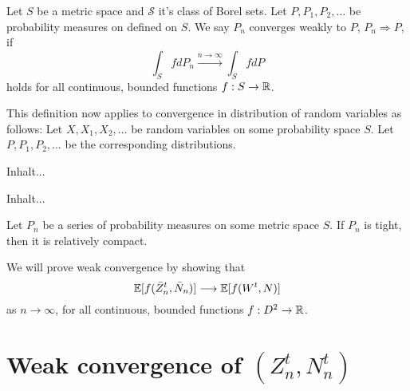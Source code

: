 \begin{definition}
	Let $S$ be a metric space and $\mathcal{S}$ it's class of Borel sets.
	Let $P, P_1, P_2, \dots$ be probability measures on defined on $S$.
	We say $P_n$ converges weakly to $P$, $P_n \Rightarrow P$, if
	\begin{equation} 
	\int_S fdP_n \xrightarrow{n \rightarrow \infty} \int_S fdP
	\end{equation}
	holds for all continuous, bounded functions $f: S \rightarrow \mathbb{R}$.
\end{definition}

This definition now applies to convergence in distribution of random variables as follows:
Let $X, X_1, X_2, \dots$ be random variables on some probability space $S$.
Let $P, P_1, P_2, \dots$ be the corresponding distributions. 

\begin{definition}[Tightness] \label{D: Tightness}
	Inhalt...
\end{definition}

\begin{definition} \label{D: Rel Compactness}
	Inhalt...
\end{definition}

\begin{theorem} \label{T: Prohorov}
	Let $P_n$ be a series of probability measures on some metric space $S$. If $P_n$ is tight, then it is relatively compact.
\end{theorem}



We will prove weak convergence by showing that
\begin{equation}
\mathbb{E}[ f(\bar{Z}^t_n, \bar{N}_n) ] \longrightarrow \mathbb{E}[ f(W^t, N) ]
\end{equation}
as $n \rightarrow \infty$, 
for all continuous, bounded functions 
$f: D^2 \rightarrow \mathbb{R}$.


\section{Weak convergence of $(Z^t_n, N^t_n)$}
